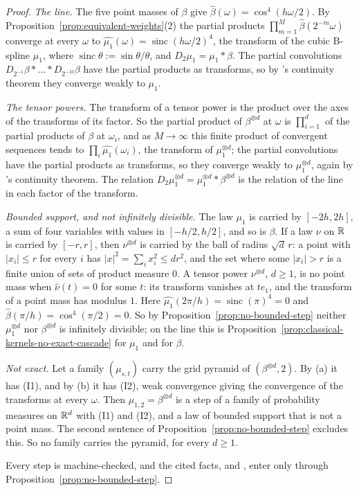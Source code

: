 \begin{proof}
\leanok
{}
\emph{The line.} The five point masses of $\beta$ give $\widehat{\beta}(\omega) = \cos^4(h\omega/2)$.
By Proposition~\ref{prop:equivalent-weights}(2) the partial products
$\prod_{m=1}^M\widehat{\beta}(2^{-m}\omega)$ converge at every $\omega$ to
$\widehat{\mu_1}(\omega) = \operatorname{sinc}(h\omega/2)^4$, the transform of the cubic B-spline
$\mu_1$, where $\operatorname{sinc}\theta := \sin\theta/\theta$, and $D_2\mu_1 = \mu_1 * \beta$. The
partial convolutions $D_{2^{-1}}\beta * \dots * D_{2^{-M}}\beta$ have the partial products as
transforms, so by \Levy's continuity theorem they converge weakly to $\mu_1$.

\emph{The tensor powers.} The transform of a tensor power is the product over the axes of the
transforms of its factor. So the partial product of $\beta^{\otimes d}$ at $\omega$ is
$\prod_{i=1}^d$ of the partial products of $\beta$ at $\omega_i$, and as $M \to \infty$ this finite
product of convergent sequences tends to $\prod_i\widehat{\mu_1}(\omega_i)$, the transform of
$\mu_1^{\otimes d}$; the partial convolutions have the partial products as transforms, so they
converge weakly to $\mu_1^{\otimes d}$, again by \Levy's continuity theorem. The relation
$D_2\mu_1^{\otimes d} = \mu_1^{\otimes d} * \beta^{\otimes d}$ is the relation of the line in each
factor of the transform.

\emph{Bounded support, and not infinitely divisible.} The law $\mu_1$ is carried by $[-2h, 2h]$, a
sum of four variables with values in $[-h/2, h/2]$, and so is $\beta$. If a law $\nu$ on $\mathbb{R}$ is
carried by $[-r, r]$, then $\nu^{\otimes d}$ is carried by the ball of radius $\sqrt d\,r$: a point
with $|x_i| \le r$ for every $i$ has $|x|^2 = \sum_ix_i^2 \le dr^2$, and the set where some
$|x_i| > r$ is a finite union of sets of product measure $0$. A tensor power $\nu^{\otimes d}$,
$d \ge 1$, is no point mass when $\widehat\nu(t) = 0$ for some $t$: its transform vanishes at
$te_1$, and the transform of a point mass has modulus $1$. Here $\widehat{\mu_1}(2\pi/h) =
\operatorname{sinc}(\pi)^4 = 0$ and $\widehat{\beta}(\pi/h) = \cos^4(\pi/2) = 0$. So by
Proposition~\ref{prop:no-bounded-step} neither $\mu_1^{\otimes d}$ nor $\beta^{\otimes d}$ is
infinitely divisible; on the line this is Proposition~\ref{prop:classical-kernels-no-exact-cascade}
for $\mu_1$ and for $\beta$.

\emph{Not exact.} Let a family $(\mu_{s,t})$ carry the grid pyramid of $(\beta^{\otimes d}, 2)$.
By (a) it has (I1), and by (b) it has (I2), weak convergence giving the convergence of the
transforms at every $\omega$. Then $\mu_{1,2} = \beta^{\otimes d}$ is a step of a family of
probability measures on $\mathbb{R}^d$ with (I1) and (I2), and a law of bounded support that is not a
point mass. The second sentence of Proposition~\ref{prop:no-bounded-step} excludes this. So no family
carries the pyramid, for every $d \ge 1$.

Every step is machine-checked, and the cited facts,  and , enter only
through Proposition~\ref{prop:no-bounded-step}.
\end{proof}

